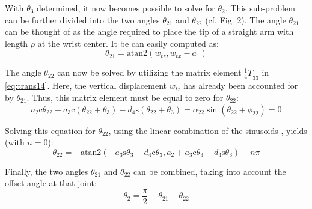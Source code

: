 \documentclass[twoside]{article}
\renewcommand{\c}{\text{c}}
\newcommand{\s}{\text{s}}
\newcommand{\T}[2]{\mbox{$_{#2}^{#1}{T}$}}
\begin{document}
\vspace{2ex}
With $\theta_3$ determined, it now becomes possible to solve for $\theta_2$.
This sub-problem can be further divided into the two angles $\theta_{21}$ and $\theta_{22}$ (cf. Fig. 2).
The angle $\theta_{21}$ can be thought of as the angle required to place the tip of a straight arm
with length $\rho$ at the wrist center. It be can easily computed as:
\begin{equation}
  \theta_{21} = \text{atan2}(w_{tz}, w_{tx} - a_1)
\end{equation}

The angle $\theta_{22}$ can now be solved by utilizing the matrix element $\T{1}{4}_{33}$ in
\eqref{eq:trans14}. Here, the vertical displacement $w_{tz}$
has already been accounted for by $\theta_{21}$. Thus, this matrix element must be equal to zero for $\theta_{22}$:
\begin{equation}
  a_2\c\theta_{22} + a_3\c(\theta_{22} + \theta_3) - d_4\s(\theta_{22} + \theta_3)
    = \alpha_{22} \sin(\theta_{22} + \phi_{22}) = 0
\end{equation}

\vspace{2ex}
\noindent Solving this equation for $\theta_{22}$, using the linear combination of the sinusoids \cite{trigonometric}, yields (with $n=0$):
\begin{equation}
  \theta_{22} = -\text{atan2}(-a_3\s\theta_3 - d_4\c\theta_3, a_2 + a_3\c\theta_3 - d_4\s\theta_3) + n\pi
\end{equation}

\vspace{2ex}
\noindent Finally, the two angles $\theta_{21}$ and $\theta_{22}$ can be combined, taking into account the
offset angle at that joint:
\begin{equation}
  \theta_2 = \frac{\pi}{2} - \theta_{21} - \theta_{22}
\end{equation}
\end{document}
